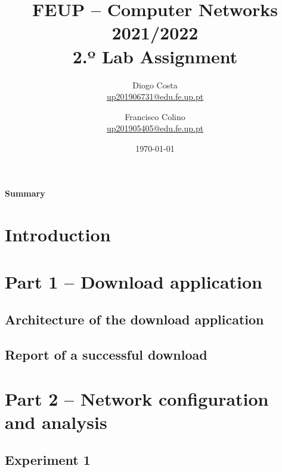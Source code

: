 \documentclass[a4paper,11pt,english]{article}
\begin{document}

\author{
    Diogo Costa\\
    \href{mailto:up201906731@edu.fe.up.pt}{up201906731@edu.fe.up.pt}
    \and
    Francisco Colino\\
    \href{mailto:up201905405@edu.fe.up.pt}{up201905405@edu.fe.up.pt}
}
\title{FEUP -- Computer Networks \large 2021/2022 \\ \large 2.º Lab Assignment}
\date{\today}
\maketitle

\begin{center}
    \textbf{Summary}
\end{center}




\section{Introduction}


\section{Part 1 -- Download application}

    \subsection{Architecture of the download application}

    \subsection{Report of a successful download}


\section{Part 2 -- Network configuration and analysis}

    \subsection{Experiment 1}
\end{document}

